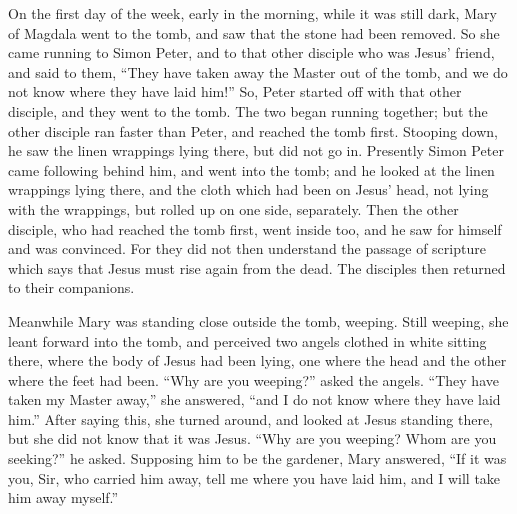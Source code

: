  On the first day of the week, early in the morning, while
it was still dark, Mary of Magdala went to the tomb, and saw that the
stone had been removed.  So she came running to Simon Peter,
and to that other disciple who was Jesus' friend, and said to them,
``They have taken away the Master out of the tomb, and we do not know
where they have laid him!''  So, Peter started off with that
other disciple, and they went to the tomb.  The two began
running together; but the other disciple ran faster than Peter, and
reached the tomb first.  Stooping down, he saw the linen
wrappings lying there, but did not go in.  Presently Simon
Peter came following behind him, and went into the tomb; and he looked
at the linen wrappings lying there,  and the cloth which had
been on Jesus' head, not lying with the wrappings, but rolled up on one
side, separately.  Then the other disciple, who had reached
the tomb first, went inside too, and he saw for himself and was
convinced.  For they did not then understand the passage of
scripture which says that Jesus must rise again from the dead.
 The disciples then returned to their companions.

 Meanwhile Mary was standing close outside the tomb,
weeping. Still weeping, she leant forward into the tomb, 
and perceived two angels clothed in white sitting there, where the body
of Jesus had been lying, one where the head and the other where the feet
had been.  ``Why are you weeping?'' asked the angels.
``They have taken my Master away,'' she answered, ``and I do not know
where they have laid him.''  After saying this, she turned
around, and looked at Jesus standing there, but she did not know that it
was Jesus.  ``Why are you weeping? Whom are you seeking?''
he asked. Supposing him to be the gardener, Mary answered, ``If it was
you, Sir, who carried him away, tell me where you have laid him, and I
will take him away myself.''

